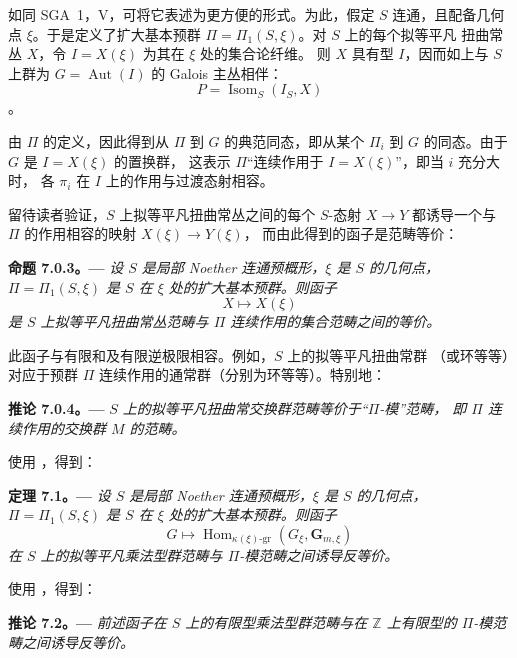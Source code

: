 如同 SGA~1，V，可将它表述为更方便的形式。为此，假定 \(S\) 连通，且配备几何点
\(\xi\)。于是定义了扩大基本预群 \(\Pi=\Pi_1(S,\xi)\)。对 \(S\) 上的每个拟等平凡
扭曲常丛 \(X\)，令 \(I=X(\xi)\) 为其在 \(\xi\) 处的集合论纤维。
则 \(X\) 具有型 \(I\)，因而如上与 \(S\) 上群为 \(G=\operatorname{Aut}(I)\)
的 Galois 主丛相伴：
\[
  P=\operatorname{Isom}_S(I_S,X)
\]
。

由 \(\Pi\) 的定义，因此得到从 \(\Pi\) 到 \(G\) 的典范同态，即从某个
\(\Pi_i\) 到 \(G\) 的同态。由于 \(G\) 是 \(I=X(\xi)\) 的置换群，
这表示 \(\Pi\)“连续作用于 \(I=X(\xi)\)”，即当 \(i\) 充分大时，
各 \(\pi_i\) 在 \(I\) 上的作用与过渡态射相容。

留待读者验证，\(S\) 上拟等平凡扭曲常丛之间的每个 \(S\)-态射 \(X\to Y\)
都诱导一个与 \(\Pi\) 的作用相容的映射 \(X(\xi)\to Y(\xi)\)，
而由此得到的函子是范畴等价：

\par\medskip\noindent{}\textbf{命题 7.0.3。---}\enspace
\emph{设 \(S\) 是局部 Noether 连通预概形，\(\xi\) 是 \(S\) 的几何点，
\(\Pi=\Pi_1(S,\xi)\) 是 \(S\) 在 \(\xi\) 处的扩大基本预群。则函子}
\[
  X\longmapsto X(\xi)
\]
\emph{是 \(S\) 上拟等平凡扭曲常丛范畴与 \(\Pi\) 连续作用的集合范畴之间的等价。}

此函子与有限和及有限逆极限相容。例如，\(S\) 上的拟等平凡扭曲常群
（或环等等）对应于预群 \(\Pi\) 连续作用的通常群（分别为环等等）。特别地：

\par\medskip\noindent{}\textbf{推论 7.0.4。---}\enspace
\emph{\(S\) 上的拟等平凡扭曲常交换群范畴等价于“\(\Pi\)-模”范畴，
即 \(\Pi\) 连续作用的交换群 \(M\) 的范畴。}

使用 ，得到：

\par\medskip\noindent{}\textbf{定理 7.1。---}\enspace
\emph{设 \(S\) 是局部 Noether 连通预概形，\(\xi\) 是 \(S\) 的几何点，
\(\Pi=\Pi_1(S,\xi)\) 是 \(S\) 在 \(\xi\) 处的扩大基本预群。则函子}
\[
  G\longmapsto
  \operatorname{Hom}_{\kappa(\xi)\text{-}\mathrm{gr}}
    (G_\xi,\mathbf{G}_{m,\xi})
\]
\emph{在 \(S\) 上的拟等平凡乘法型群范畴与 \(\Pi\)-模范畴之间诱导反等价。}

使用 ，得到：

\par\medskip\noindent{}\textbf{推论 7.2。---}\enspace
\emph{前述函子在 \(S\) 上的有限型乘法型群范畴与在 \(\mathbb{Z}\) 上有限型的
\(\Pi\)-模范畴之间诱导反等价。}

